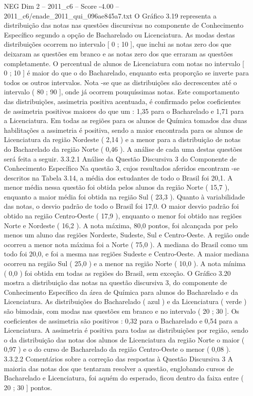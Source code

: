 \begin{textsample}{NEG Dim 2 – 2011\_c6 – Score -4.00 – 2011\_c6/enade\_2011\_qui\_096ae845a7.txt}
O Gráfico 3.19 representa a distribuição das notas nas questões discursivas no componente de Conhecimento Específico segundo a opção de Bacharelado ou Licenciatura.
As modas destas distribuições ocorrem no intervalo [ 0 ; 10 ], que inclui as notas zero dos que deixaram as questões em branco e as notas zero dos que erraram as questões completamente.
O percentual de alunos de Licenciatura com notas no intervalo [ 0 ; 10 ] é maior do que o do Bacharelado, enquanto esta proporção se inverte para todos os outros intervalos.
Nota -se que as distribuições são decrescentes até o intervalo ( 80 ; 90 ], onde já ocorrem pouquíssimas notas.
Este comportamento das distribuições, assimetria positiva acentuada, é confirmado pelos coeficientes de assimetria positivos maiores do que um : 1,35 para o Bacharelado e 1,71 para a Licenciatura.
Em todas as regiões para os alunos de Química tomados das duas habilitações a assimetria é positiva, sendo a maior encontrada para os alunos de Licenciatura da região Nordeste ( 2,14 ) e a menor para a distribuição de notas do Bacharelado da região Norte ( 0,46 ).
A análise de cada uma destas questões será feita a seguir. 3.3.2.1 Análise da Questão Discursiva 3 do Componente de Conhecimento Específico Na questão 3, cujos resultados aferidos encontram -se descritos na Tabela 3.14, a média dos estudantes de todo o Brasil foi 20,1.
A menor média nessa questão foi obtida pelos alunos da região Norte ( 15,7 ), enquanto a maior média foi obtida na região Sul ( 23,3 ).
Quanto à variabilidade das notas, o desvio padrão de todo o Brasil foi 17,0.
O maior desvio padrão foi obtido na região Centro-Oeste ( 17,9 ), enquanto o menor foi obtido nas regiões Norte e Nordeste ( 16,2 ).
A nota máxima, 80,0 pontos, foi alcançada por pelo menos um aluno das regiões Nordeste, Sudeste, Sul e Centro-Oeste.
A região onde ocorreu a menor nota máxima foi a Norte ( 75,0 ).
A mediana do Brasil como um todo foi 20,0, e foi a mesma nas regiões Sudeste e Centro-Oeste.
A maior mediana ocorreu na região Sul ( 25,0 ) e a menor na região Norte ( 10,0 ).
A nota mínima ( 0,0 ) foi obtida em todas as regiões do Brasil, sem exceção.
O Gráfico 3.20 mostra a distribuição das notas na questão discursiva 3, do componente de Conhecimento Específico da área de Química para alunos do Bacharelado e da Licenciatura.
As distribuições do Bacharelado ( azul ) e da Licenciatura ( verde ) são bimodais, com modas nas questões em branco e no intervalo ( 20 ; 30 ].
Os coeficientes de assimetria são positivos : 0,32 para o Bacharelado e 0,54 para a Licenciatura.
A assimetria é positiva para todas as distribuições por região, sendo o da distribuição das notas dos alunos de Licenciatura da região Norte o maior ( 0,97 ) e o do curso de Bacharelado da região Centro-Oeste o menor ( 0,08 ). 3.3.2.2 Comentários sobre a correção das respostas à Questão Discursiva 3 A maioria das notas dos que tentaram resolver a questão, englobando cursos de Bacharelado e Licenciatura, foi aquém do esperado, ficou dentro da faixa entre ( 20 ; 30 ] pontos.

\end{textsample}
